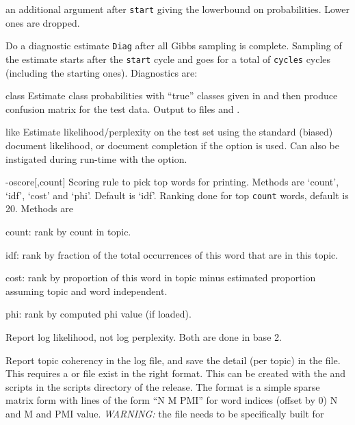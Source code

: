 \documentclass[a4paper,english]{article}
\begin{document}
\begin{Description}
an additional argument after \texttt{start} giving the lowerbound
on probabilities.  Lower ones are dropped.
\item[\OptArg{-L}{Diag,cycles,start}] 
Do a diagnostic estimate \texttt{Diag} after
all Gibbs sampling is complete.
Sampling of the estimate starts after the \texttt{start} cycle 
and goes for a total of \texttt{cycles} cycles
(including the starting ones).
Diagnostics are:
\begin{Description}[class]\setlength{\itemsep}{0cm}
\item[class] 
Estimate class probabilities with ``true'' classes
given in  and then
produce confusion matrix for the test data.
Output to files
 and .
\item[like] 
Estimate likelihood/perplexity on the test set
using the standard (biased) document likelihood,
or document completion if the 
option is used.
Can also be instigated during run-time with the
 option.
\end{Description}
\item[{-o}{score[,count]}]  Scoring rule to pick top words for printing.
Methods are `count', `idf', `cost' and `phi'.  Default is `idf'.
Ranking done for top \texttt{count} words, default is 20.
Methods are
\begin{Description}
\item[count:] rank by count in topic.
\item[idf:] rank by fraction of the total occurrences of
       this word  that are in this topic.
\item[cost:] rank by proportion of this word in topic
       minus estimated proportion assuming topic and word independent.
\item[phi:] rank by computed phi value (if loaded).
\end{Description}
\item[\Opt{-O}] Report log likelihood, not log perplexity.  Both
are done in base 2.
\item[\Opt{-p}] Report topic coherency in the log file, 
and save the detail (per topic) in the  file.
This requires 
a  or  file exist
in the right format.  This can be created with the 
 and
 scripts in the scripts directory of the release.
The format is a simple sparse matrix form with lines
of the form ``N M PMI'' for word indices
(offset by 0) N and M and PMI value.
\emph{WARNING:}  the file  needs to be specifically built for 

\end{Description}
\end{document}
